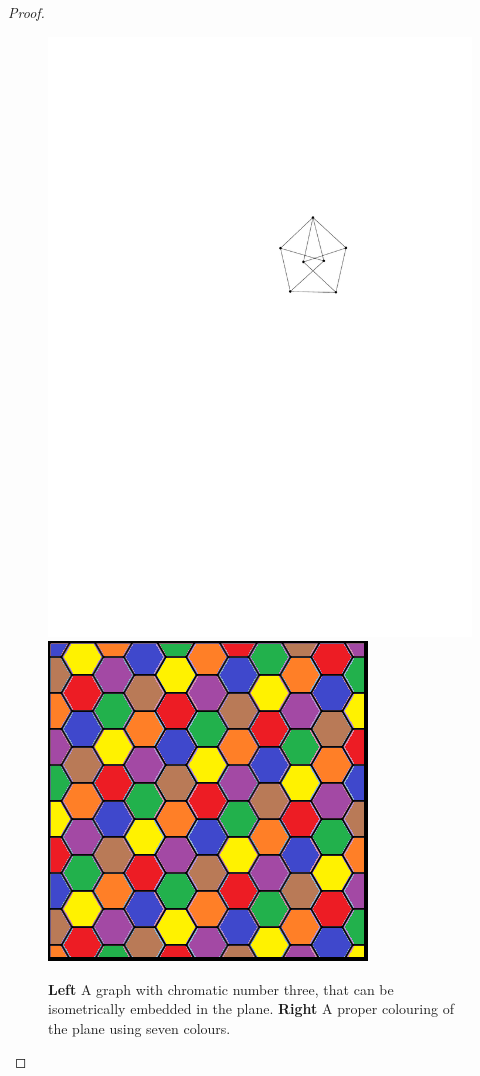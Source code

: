 \documentclass[12pt]{amsart}
\theoremstyle{definition}
\begin{document}
\begin{proof}
\begin{figure}[h]
\centering
\includegraphics[scale=0.7]{../imgs/plane_chromat}
\hspace{2cm}
\includegraphics[scale=0.3]{../imgs/plane_chromat7.png}
\caption{\textbf{Left} A graph with chromatic number three, that can be isometrically embedded in the plane. \textbf{Right} A proper colouring of the plane using seven colours.\label{fig:plane_chromat}}
\end{figure}

\end{proof}
\end{document}
